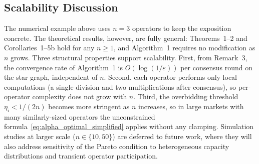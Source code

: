 \documentclass[conference]{IEEEtran}
\begin{document}
\subsection{Scalability Discussion}

The numerical example above uses $n=3$ operators to keep the exposition concrete. The theoretical results, however, are fully general: Theorems~1--2 and Corollaries~1--5b hold for any $n\geq 1$, and Algorithm~1 requires no modification as $n$ grows. Three structural properties support scalability. First, from Remark~3, the convergence rate of Algorithm~1 is $O(\log(1/\varepsilon))$ per consensus round on the star graph, independent of $n$. Second, each operator performs only local computations (a single division and two multiplications after consensus), so per-operator complexity does not grow with $n$. Third, the overbidding threshold $\eta_i < 1/(2n)$ becomes more stringent as $n$ increases, so in large markets with many similarly-sized operators the unconstrained formula~\eqref{eq:alpha_optimal_simplified} applies without any clamping. Simulation studies at larger scale ($n \in \{10, 50\}$) are deferred to future work, where they will also address sensitivity of the Pareto condition to heterogeneous capacity distributions and transient operator participation.
\end{document}
